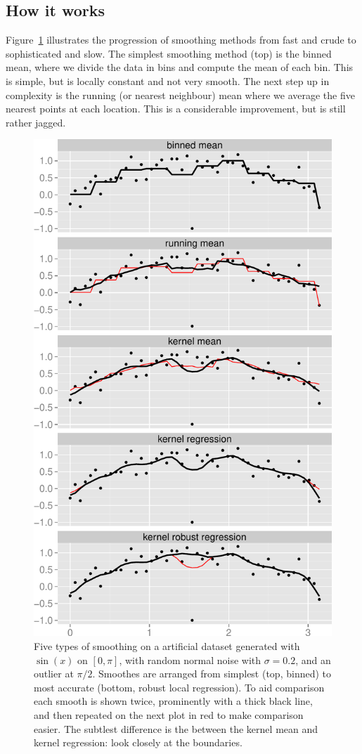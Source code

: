 \documentclass[journal]{vgtc}                %
\begin{document}
\subsection{How it works}

Figure~\ref{fig:smooth-types} illustrates the progression of smoothing methods from fast and crude to sophisticated and slow. The simplest smoothing method (top) is the binned mean, where we divide the data in bins and compute the mean of each bin. This is simple, but is locally constant and not very smooth. The next step up in complexity is the running (or nearest neighbour) mean where we average the five nearest points at each location. This is a considerable improvement, but is still rather jagged.

\begin{figure}[htb]
 \centering
 \includegraphics[width=0.75\linewidth]{smooth-types}
 \caption{Five types of smoothing on a artificial dataset generated with $\sin(x)$ on $[0, \pi]$, with random normal noise with $\sigma = 0.2$, and an outlier at $\pi / 2$. Smoothes are arranged from simplest (top, binned) to most accurate (bottom, robust local regression). To aid comparison each smooth is shown twice, prominently with a thick black line, and then repeated on the next plot in red to make comparison easier. The subtlest difference is the between the kernel mean and kernel regression: look closely at the boundaries.}
 \label{fig:smooth-types}
\end{figure}
\end{document}
